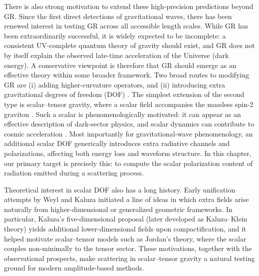 There is also strong motivation to extend these high-precision predictions beyond GR. Since the first direct detections of gravitational waves, there has been renewed interest in testing GR across all accessible length scales. While GR has been extraordinarily successful, it is widely expected to be incomplete: a consistent UV-complete quantum theory of gravity should exist, and GR does not by itself explain the observed late-time acceleration of the Universe (dark energy). A conservative viewpoint is therefore that GR should emerge as an effective theory within some broader framework. Two broad routes to modifying GR are (i) adding higher-curvature operators, and (ii) introducing extra gravitational degrees of freedom (DOF) \cite{stelle1,Alexeev:1996vs,Lehebel:2018zga,Volkov:2016ehx,Kunz:2006ca}. The simplest extension of the second type is scalar--tensor gravity, where a scalar field accompanies the massless spin-2 graviton \cite{Damour:1992we,Horbatsch:2015bua,Schon:2021pcv,Rainer:1996gw,DeFelice:2011bh}. Such a scalar is phenomenologically motivated: it can appear as an effective description of dark-sector physics, and scalar dynamics can contribute to cosmic acceleration \cite{DeFelice:2011bh,Gsponer:2021obj}. Most importantly for gravitational-wave phenomenology, an additional scalar DOF generically introduces extra radiative channels and polarizations, affecting both energy loss and waveform structure. In this chapter, our primary target is precisely this: to compute the scalar polarization content of radiation emitted during a scattering process.

Theoretical interest in scalar DOF also has a long history. Early unification attempts by Weyl and Kaluza \cite{weyl} initiated a line of ideas in which extra fields arise naturally from higher-dimensional or generalized geometric frameworks. In particular, Kaluza’s five-dimensional proposal (later developed as Kaluza--Klein theory) yields additional lower-dimensional fields upon compactification, and it helped motivate scalar--tensor models such as Jordan’s theory, where the scalar couples non-minimally to the tensor sector. These motivations, together with the observational prospects, make scattering in scalar--tensor gravity a natural testing ground for modern amplitude-based methods.

